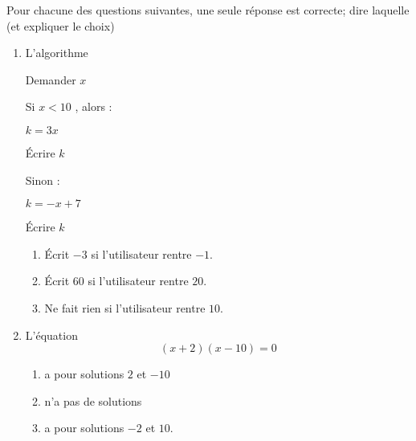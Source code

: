 
\begin{exercice}[\ldots/4]\label{exosmath-0630}

    Pour chacune des questions suivantes, une seule réponse est correcte; dire laquelle (et expliquer le choix)
    \begin{multicols}{2}
    \begin{enumerate}
        \item
           L'algorithme

    \begin{fmpage}{0.9\linewidth}

        Demander \( x\)

    Si  \( x< 10\) , alors :

    \hspace{0.5cm} \( k=3x\)

    \hspace{0.5cm} Écrire \( k\) 

    Sinon :

    \hspace{0.5cm} \( k=-x+7\)

    \hspace{0.5cm} Écrire \( k\) 

\end{fmpage}

    \begin{enumerate}
        \item
            Écrit \( -3\) si l'utilisateur rentre \( -1\).
        \item
            Écrit \( 60 \) si l'utilisateur rentre \( 20\).
        \item
            Ne fait rien si l'utilisateur rentre \( 10\).
    \end{enumerate}
    
\item

    L'équation
    \begin{equation*}
        (x+2)(x-10)=0
    \end{equation*}
    \begin{enumerate}
        \item
            a pour solutions \( 2\) et \( -10\)
        \item
            n'a pas de solutions
        \item
            a pour solutions \( -2\) et \( 10\).
    \end{enumerate}
    

\end{enumerate}
\end{multicols}
\end{exercice}
